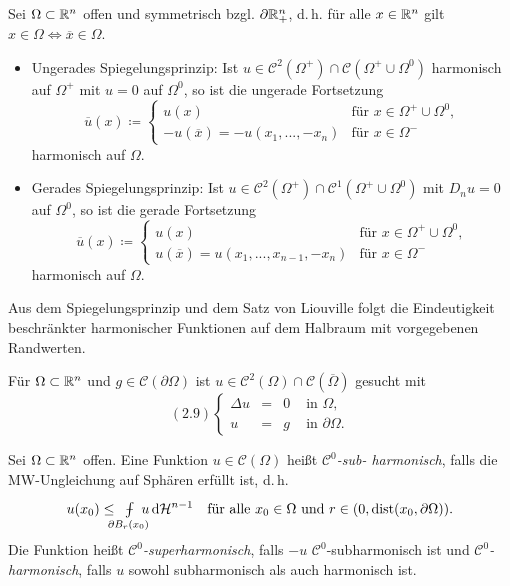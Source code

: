 \documentclass{cheat-sheet}
\newcommand{\HM}{\mathcal{H}} %
\newcommand{\dist}{\mathrm{dist}} %
\def\Xint#1{\mathchoice
   {\XXint\displaystyle\textstyle{#1}}%
   {\XXint\textstyle\scriptstyle{#1}}%
   {\XXint\scriptstyle\scriptscriptstyle{#1}}%
   {\XXint\scriptscriptstyle\scriptscriptstyle{#1}}%
   \!\int}
\def\XXint#1#2#3{{\setbox0=\hbox{$#1{#2#3}{\int}$}
     \vcenter{\hbox{$#2#3$}}\kern-.5\wd0}}
\def\dashint{\Xint-}
\newcommand{\mymvint}[2]{{\textstyle \dashint\limits_{#1}^{#2}}}
\newcommand{\MVInt}[4]{\mymvint{#1}{#2} #3 \,\d #4}
\begin{document}
\begin{satz}
  Sei $\Omega \subset \mathbb{R}^n$ offen und symmetrisch bzgl. $\partial \mathbb{R}^n_+$, d.\,h. für alle $x \in \mathbb{R}^n$ gilt $x \in \Omega \iff \overline{x} \in \Omega$.
  \begin{itemize}
    \item Ungerades Spiegelungsprinzip: Ist $u \in \mathcal{C}^2(\Omega^+) \cap \mathcal{C}(\Omega^+ \cup \Omega^0)$ harmonisch auf $\Omega^+$ mit $u = 0$ auf $\Omega^0$, so ist die ungerade Fortsetzung
    \[
      \overline{u}(x) \coloneqq \begin{cases}
        u(x) & \text{für $x \in \Omega^+ \cup \Omega^0$,}\\
        -u(\overline{x}) = -u(x_1, ..., -x_n) & \text{für $x \in \Omega^-$}
      \end{cases}
    \]
    harmonisch auf $\Omega$.
    \item Gerades Spiegelungsprinzip: Ist $u \in \mathcal{C}^2(\Omega^+) \cap \mathcal{C}^1(\Omega^+ \cup \Omega^0)$ mit $D_n u = 0$ auf $\Omega^0$, so ist die gerade Fortsetzung
    \[
      \overline{u}(x) \coloneqq \begin{cases}
        u(x) & \text{für $x \in \Omega^+ \cup \Omega^0$,}\\
        u(\overline{x}) = u(x_1, ..., x_{n-1}, -x_n) & \text{für $x \in \Omega^-$}
      \end{cases}
    \]
    harmonisch auf $\Omega$.
  \end{itemize}
\end{satz}

\begin{bem}
  Aus dem Spiegelungsprinzip und dem Satz von Liouville folgt die Eindeutigkeit beschränkter harmonischer Funktionen auf dem Halbraum mit vorgegebenen Randwerten.
\end{bem}


\begin{prob}
  Für $\Omega \subset \mathbb{R}^n$ und $g \in \mathcal{C}(\partial \Omega)$ ist $u \in \mathcal{C}^2(\Omega) \cap \mathcal{C}(\overline{\Omega})$ gesucht mit
  \[
    (2.9) \left\{ \begin{array}{rlll}
      \Delta u &=& 0 &\text{ in $\Omega$,}\\
      u &=& g &\text{ in $\partial \Omega$.}
    \end{array} \right.
  \]
\end{prob}

\begin{defn}
  Sei $\Omega \subset \mathbb{R}^n$ offen. Eine Funktion $u \in \mathcal{C}(\Omega)$ heißt \emph{$\mathcal{C}^0$-sub- harmonisch}, falls die MW-Ungleichung auf Sphären erfüllt ist, d.\,h.
  \[
    u(x_0) \leq \enspace \MVInt{\mathclap{\partial B_r(x_0)}}{}{\enspace u}{\HM^{n-1}} \quad
    \text{für alle $x_0 \in \Omega$ und $r \in \ointerval{0}{\dist(x_0, \partial \Omega)}$.}
  \]
  Die Funktion heißt \emph{$\mathcal{C}^0$-superharmonisch}, falls $-u$ $\mathcal{C}^0$-subharmonisch ist und \emph{$\mathcal{C}^0$-harmonisch}, falls $u$ sowohl subharmonisch als auch harmonisch ist.
\end{defn}
\end{document}
